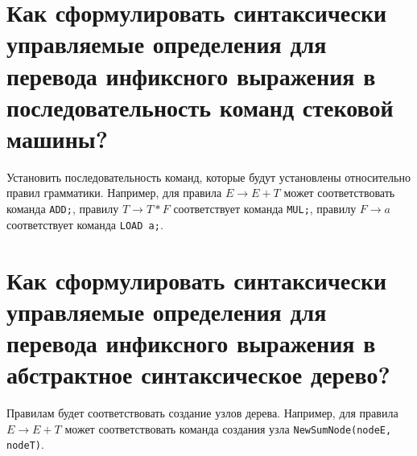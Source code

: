 \section{Как сформулировать синтаксически управляемые определения для перевода инфиксного выражения в последовательность команд стековой машины?}

Установить последовательность команд, которые будут установлены относительно правил грамматики.
 Например, для правила $E \rightarrow E + T$ может соответствовать команда \texttt{ADD;}, правилу 
 $T \rightarrow T * F$ соответствует команда \texttt{MUL;}, правилу $F \rightarrow a$ соответствует команда \texttt{LOAD a;}.

\section{Как сформулировать синтаксически управляемые определения для перевода инфиксного выражения в абстрактное синтаксическое дерево?}

Правилам будет соответствовать создание узлов дерева.
Например, для правила $E \rightarrow E + T$ 
может соответствовать команда создания узла \texttt{NewSumNode(nodeE, nodeT)}.